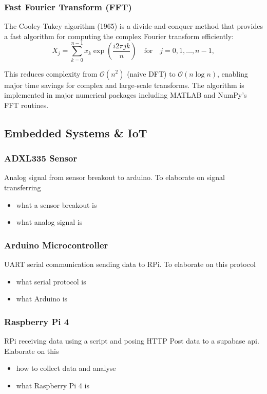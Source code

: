 \subsubsection{Fast Fourier Transform (FFT)}
{

The Cooley-Tukey algorithm (1965) is a divide-and-conquer method that provides a fast algorithm for computing the complex Fourier transform efficiently:
\[
X_j = \sum_{k=0}^{n-1} x_k \exp\left( \frac{i2\pi jk}{n} \right) \quad \text{for} \quad j = 0,1,\dots,n-1,
\]

This reduces complexity from $\mathcal{O}(n^2)$ (naive DFT) to $\mathcal{O}(n \log n)$, enabling major time savings for complex and large-scale transforms. The algorithm is implemented in major numerical packages including MATLAB and NumPy's FFT routines.
}

\subsection{Embedded Systems \& IoT}
\subsubsection{ADXL335 Sensor}
Analog signal from sensor breakout to arduino. To elaborate on signal transferring
\begin{itemize}
\item what a sensor breakout is
\item what analog signal is
\end{itemize}


\subsubsection{Arduino Microcontroller}
UART serial communication sending data to RPi. To elaborate on this protocol
\begin{itemize}
\item what serial protocol is
\item what Arduino is
\end{itemize}

\subsubsection{Raspberry Pi 4}
RPi receiving data using a script and posing HTTP Post data to a supabase api. Elaborate on this

\begin{itemize}
\item how to collect data and analyse
\item what Raspberry Pi 4 is
\end{itemize}




